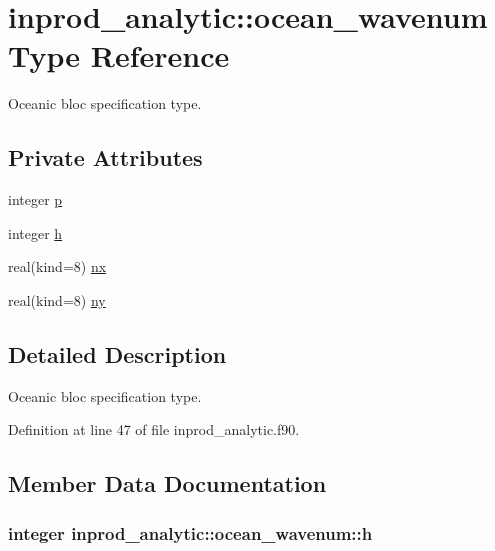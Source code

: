\hypertarget{structinprod__analytic_1_1ocean__wavenum}{}\section{inprod\+\_\+analytic\+:\+:ocean\+\_\+wavenum Type Reference}
\label{structinprod__analytic_1_1ocean__wavenum}


Oceanic bloc specification type.  


\subsection*{Private Attributes}
\begin{DoxyCompactItemize}
\item 
integer \hyperlink{structinprod__analytic_1_1ocean__wavenum_a3170ff1b2a81b58ae81527a964682c06}{p}
\item 
integer \hyperlink{structinprod__analytic_1_1ocean__wavenum_a0669827dd9b250ef505da012599c40ff}{h}
\item 
real(kind=8) \hyperlink{structinprod__analytic_1_1ocean__wavenum_a6084ea7c554f942e74779a2be38b7d3d}{nx}
\item 
real(kind=8) \hyperlink{structinprod__analytic_1_1ocean__wavenum_a0738c305f503d7864a9073c5cea352ab}{ny}
\end{DoxyCompactItemize}


\subsection{Detailed Description}
Oceanic bloc specification type. 

Definition at line 47 of file inprod\+\_\+analytic.\+f90.



\subsection{Member Data Documentation}
\subsubsection[{\texorpdfstring{h}{h}}]{\setlength{\rightskip}{0pt plus 5cm}integer inprod\+\_\+analytic\+::ocean\+\_\+wavenum\+::h\hspace{0.3cm}{\ttfamily [private]}}\hypertarget{structinprod__analytic_1_1ocean__wavenum_a0669827dd9b250ef505da012599c40ff}{}\label{structinprod__analytic_1_1ocean__wavenum_a0669827dd9b250ef505da012599c40ff}


